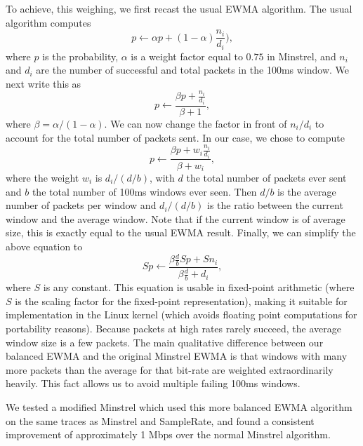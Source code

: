 \documentclass[twocolumn,10pt]{article}
\begin{document}
To achieve, this weighing, we first recast the usual EWMA algorithm.
The usual algorithm computes $$p \gets \alpha p + (1 - \alpha)
\frac{n_i}{d_i}),$$ where $p$ is the probability, $\alpha$ is a
weight factor equal to $0.75$ in Minstrel, and $n_i$ and $d_i$ are the
number of successful and total packets in the 100ms window.  We next
write this as $$p \gets \frac{\beta p + \frac{n_i}{d_i}}{\beta + 1},$$
where $\beta = \alpha / (1 - \alpha)$.  We can now change the factor
in front of $n_i / d_i$ to account for the total number of packets
sent.  In our case, we chose to compute $$p \gets \frac{\beta p + w_i
  \frac{n_i}{d_i}}{\beta + w_i},$$ where the weight $w_i$ is $d_i / (d
/ b)$, with $d$ the total number of packets ever sent and $b$ the
total number of 100ms windows ever seen.  Then $d / b$ is the average
number of packets per window and $d_i / (d / b)$ is the ratio between
the current window and the average window.  Note that if the current
window is of average size, this is exactly equal to the usual EWMA
result.  Finally, we can simplify the above equation to $$S p \gets
\frac{\beta \frac{d}{b} S p + S n_i}{\beta \frac{d}{b} + d_i},$$ where
$S$ is any constant.  This equation is usable in fixed-point
arithmetic (where $S$ is the scaling factor for the fixed-point
representation), making it suitable for implementation in the Linux
kernel (which avoids floating point computations for
portability reasons).  Because packets at high rates rarely succeed,
the average window size is a few packets.  The main qualitative
difference between our balanced EWMA and the original Minstrel EWMA is
that windows with many more packets than the average for that bit-rate are
weighted extraordinarily heavily. This fact allows us to avoid multiple 
failing 100ms windows.

We tested a modified Minstrel which used this more balanced EWMA
algorithm on the same traces as Minstrel and SampleRate, and found a
consistent improvement of approximately 1 Mbps over the normal
Minstrel algorithm.
\end{document}
